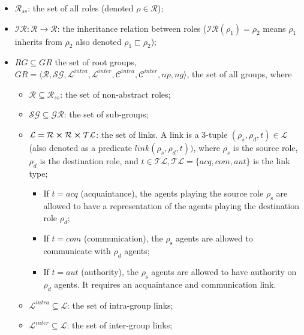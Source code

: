 \documentclass{ecai}
\newcounter{relation}
\begin{document}
\begin{itemize}

    \item $\mathcal{R}_{ss}$: the set of all roles (denoted $\rho \in \mathcal{R}$);

    \item $\mathcal{IR}: \mathcal{R} \rightarrow \mathcal{R}$: the inheritance relation between roles ($\mathcal{IR}(\rho_1) = \rho_2$ means $\rho_1$ inherits from $\rho_2$ also denoted $\rho_1 \sqsubset \rho_2$);

    \item $RG \subseteq GR$ the set of root groups, $GR = \langle \mathcal{R}, \mathcal{SG}, \mathcal{L}^{intra}, \mathcal{L}^{inter}, \mathcal{C}^{intra}, \mathcal{C}^{inter}, np, ng \rangle$, the set of all groups, where

          \begin{itemize}

              \item $\mathcal{R} \subseteq \mathcal{R}_{ss}$: the set of non-abstract roles;

              \item $\mathcal{SG} \subseteq \mathcal{GR}$: the set of sub-groups;

              \item $\mathcal{L} = \mathcal{R} \cross \mathcal{R} \cross \mathcal{TL}$: the set of links. A link is a 3-tuple $(\rho_s,\rho_d,t) \in \mathcal{L}$ (also denoted as a predicate $link(\rho_s,\rho_d,t))$, where $\rho_{s}$ is the source role, $\rho_{d}$ is the destination role, and $t \in \mathcal{TL}, \mathcal{TL} = \{acq, com, aut\}$ is the link type;
                    \begin{itemize}
                        \item If $t = acq$ (acquaintance), the agents playing the source role $\rho_{\mathrm{s}}$ are allowed to have a representation of the agents playing the destination role $\rho_{d}$;
                        \item If $t = com$ (communication), the $\rho_{\mathrm{s}}$ agents are allowed to communicate with $\rho_{d}$ agents;
                        \item If $t = aut$ (authority), the $\rho_{\mathrm{s}}$ agents are allowed to have authority on $\rho_{d}$ agents. It requires an acquaintance and communication link.
                    \end{itemize}
              \item $\mathcal{L}^{intra} \subseteq \mathcal{L}$: the set of intra-group links;
              \item $\mathcal{L}^{inter} \subseteq \mathcal{L}$: the set of inter-group links;


\end{itemize}
\end{itemize}
\end{document}
